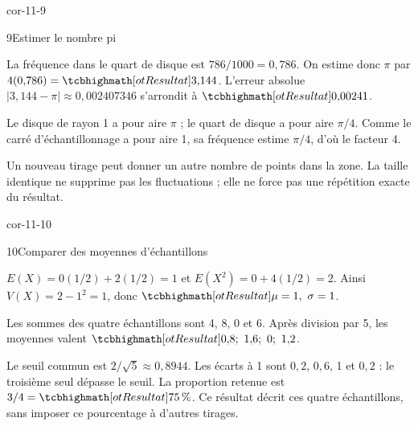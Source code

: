 \begin{blocLivre}{cor-11-9}
\begin{corrige}{9}{Estimer le nombre pi}
\begin{questions}
\item La fréquence dans le quart de disque est $786/1000=0{,}786$.
On estime donc $\pi$ par $4(0{,}786)=\res{3{,}144}$.
L’erreur absolue $|3{,}144-\pi|\approx0{,}002407346$ s’arrondit à $\res{0{,}00241}$.
\item Le disque de rayon 1 a pour aire $\pi$ ; le quart de disque a pour aire $\pi/4$.
Comme le carré d’échantillonnage a pour aire 1, sa fréquence estime $\pi/4$, d’où le facteur 4.
\item Un nouveau tirage peut donner un autre nombre de points dans la zone.
La taille identique ne supprime pas les fluctuations ; elle ne force pas une répétition exacte du résultat.
\end{questions}

\label{figlivre-r11-09-zone-cor}

\end{corrige}
\end{blocLivre}
\begin{blocLivre}{cor-11-10}
\begin{corrige}{10}{Comparer des moyennes d'échantillons}
\begin{questions}
\item $E(X)=0(1/2)+2(1/2)=1$ et $E(X^2)=0+4(1/2)=2$.
Ainsi $V(X)=2-1^2=1$, donc $\res{\mu=1,\ \sigma=1}$.
\item Les sommes des quatre échantillons sont 4, 8, 0 et 6.
Après division par 5, les moyennes valent $\res{0{,}8;\ 1{,}6;\ 0;\ 1{,}2}$.
\item Le seuil commun est $2/\sqrt5\approx0{,}8944$.
Les écarts à 1 sont $0{,}2$, $0{,}6$, 1 et $0{,}2$ : le troisième seul dépasse le seuil.
La proportion retenue est $3/4=\res{75\,\%}$.
Ce résultat décrit ces quatre échantillons, sans imposer ce pourcentage à d’autres tirages.
\end{questions}

\label{figlivre-r11-10-critere-cor}

\end{corrige}
\end{blocLivre}
